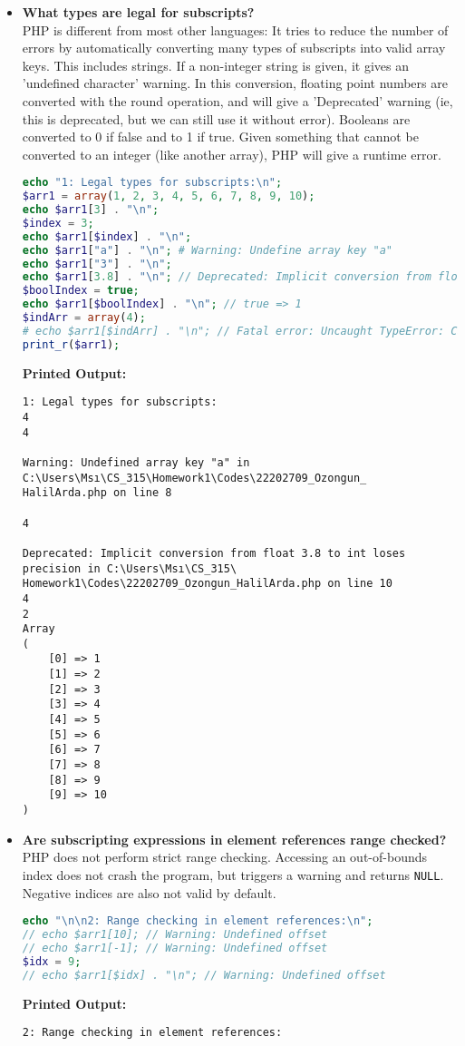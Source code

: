 \documentclass{article}
\begin{document}
\begin{itemize}

\item \textbf{What types are legal for subscripts?} \\
PHP is different from most other languages: It tries to reduce the number of errors by automatically converting many types of subscripts into valid array keys. This includes strings. If a non-integer string is given, it gives an 'undefined character' warning. In this conversion, floating point numbers are converted with the round operation, and will give a 'Deprecated' warning (ie, this is deprecated, but we can still use it without error). Booleans are converted to 0 if false and to 1 if true. Given something that cannot be converted to an integer (like another array), PHP will give a runtime error. \begin{lstlisting}[language=PHP]
echo "1: Legal types for subscripts:\n";
$arr1 = array(1, 2, 3, 4, 5, 6, 7, 8, 9, 10);
echo $arr1[3] . "\n";
$index = 3;
echo $arr1[$index] . "\n";
echo $arr1["a"] . "\n"; # Warning: Undefine array key "a"
echo $arr1["3"] . "\n";
echo $arr1[3.8] . "\n"; // Deprecated: Implicit conversion from float 3.8 to int loses precision on line 19
$boolIndex = true;
echo $arr1[$boolIndex] . "\n"; // true => 1
$indArr = array(4);
# echo $arr1[$indArr] . "\n"; // Fatal error: Uncaught TypeError: Cannot access offset of type array on array 
print_r($arr1);
\end{lstlisting}
\textbf{Printed Output:}
\begin{verbatim}
1: Legal types for subscripts:
4
4

Warning: Undefined array key "a" in C:\Users\Msı\CS_315\Homework1\Codes\22202709_Ozongun_
HalilArda.php on line 8

4

Deprecated: Implicit conversion from float 3.8 to int loses precision in C:\Users\Msı\CS_315\
Homework1\Codes\22202709_Ozongun_HalilArda.php on line 10
4
2
Array
(
    [0] => 1
    [1] => 2
    [2] => 3
    [3] => 4
    [4] => 5
    [5] => 6
    [6] => 7
    [7] => 8
    [8] => 9
    [9] => 10
)
\end{verbatim}



\item \textbf{Are subscripting expressions in element references range checked?} \\	
PHP does not perform strict range checking. Accessing an out-of-bounds index does not crash the program, but triggers a warning and returns \texttt{NULL}. Negative indices are also not valid by default.
\begin{lstlisting}[language=PHP]
echo "\n\n2: Range checking in element references:\n";
// echo $arr1[10]; // Warning: Undefined offset
// echo $arr1[-1]; // Warning: Undefined offset
$idx = 9;
// echo $arr1[$idx] . "\n"; // Warning: Undefined offset
\end{lstlisting}
\textbf{Printed Output:}
\begin{verbatim}
2: Range checking in element references:
\end{verbatim}




\end{itemize}
\end{document}
